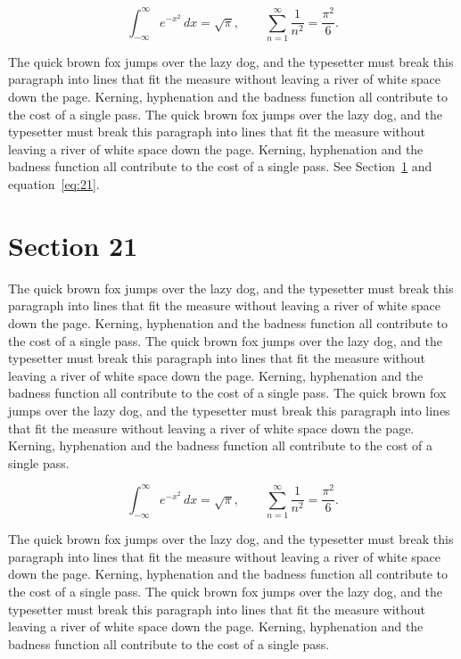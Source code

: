 \documentclass{article}
\begin{document}
\begin{equation}\label{eq:20}
\int_{-\infty}^{\infty} e^{-x^{2}}\,dx = \sqrt{\pi}, \qquad
\sum_{n=1}^{\infty} \frac{1}{n^{2}} = \frac{\pi^{2}}{6}.
\end{equation}

The quick brown fox jumps over the lazy dog, and the typesetter must break this paragraph into lines that fit the measure without leaving a river of white space down the page. Kerning, hyphenation and the badness function all contribute to the cost of a single pass. The quick brown fox jumps over the lazy dog, and the typesetter must break this paragraph into lines that fit the measure without leaving a river of white space down the page. Kerning, hyphenation and the badness function all contribute to the cost of a single pass. 
See Section~\ref{sec:21} and equation~\eqref{eq:21}.
\section{Section 21}
\label{sec:21}
The quick brown fox jumps over the lazy dog, and the typesetter must break this paragraph into lines that fit the measure without leaving a river of white space down the page. Kerning, hyphenation and the badness function all contribute to the cost of a single pass. The quick brown fox jumps over the lazy dog, and the typesetter must break this paragraph into lines that fit the measure without leaving a river of white space down the page. Kerning, hyphenation and the badness function all contribute to the cost of a single pass. The quick brown fox jumps over the lazy dog, and the typesetter must break this paragraph into lines that fit the measure without leaving a river of white space down the page. Kerning, hyphenation and the badness function all contribute to the cost of a single pass. 

\begin{equation}\label{eq:21}
\int_{-\infty}^{\infty} e^{-x^{2}}\,dx = \sqrt{\pi}, \qquad
\sum_{n=1}^{\infty} \frac{1}{n^{2}} = \frac{\pi^{2}}{6}.
\end{equation}

The quick brown fox jumps over the lazy dog, and the typesetter must break this paragraph into lines that fit the measure without leaving a river of white space down the page. Kerning, hyphenation and the badness function all contribute to the cost of a single pass. The quick brown fox jumps over the lazy dog, and the typesetter must break this paragraph into lines that fit the measure without leaving a river of white space down the page. Kerning, hyphenation and the badness function all contribute to the cost of a single pass. 
\end{document}
